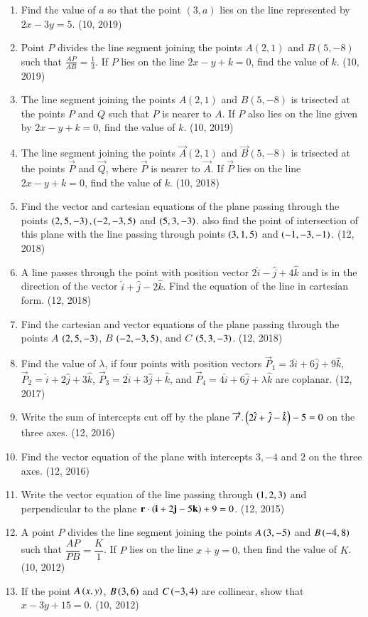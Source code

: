 \begin{enumerate}[label=\thesubsection.\arabic*, ref=\thesubsection.\theenumi]
\item Find the value of $a$ so that the point $(3, a)$ lies on the line represented by $2x - 3y = 5$. \hfill (10, 2019)
\item Point $P$ divides the line segment joining the points $A(2, 1)$ and $B(5, -8)$ such that $\frac{AP}{AB} = \frac{1}{3}$. If $P$ lies on the line $2x - y + k = 0$, find the value of $k$. \hfill (10, 2019)
\item The line segment joining the points $A(2, 1)$ and $B(5, -8)$ is trisected at the points $P$ and $Q$ such that $P$ is nearer to $A$. If $P$ also lies on the line given by $2x - y + k = 0$, find the value of $k$. \hfill (10, 2019)
    \item The line segment joining the points $\vec{A}(2,1)$ and $\vec{B}(5,-8)$ is trisected at the points $\vec{P}$ and $\vec{Q}$, where $\vec{P}$ is nearer to $\vec{A}$. If $\vec{P}$ lies on the line $2x - y + k = 0$, find the value of $k$. \hfill (10, 2018)
\item Find the vector and cartesian equations of the plane passing through the points $\left(2,5,-3\right),\left(-2,-3,5\right)$ and $\left(5,3,-3\right)$. also find the point of intersection of this plane with the line passing through points $\left(3,1,5\right)$ and $\left(-1,-3,-1\right)$.
\hfill (12, 2018)
\item A line passes through the point with position vector $2\hat{i}-\hat{j}+4\hat{k}$ and is in the direction of the vector $\hat{i}+\hat{j}-2\hat{k}$. Find the equation of the line in cartesian form.
\hfill (12, 2018) 
\item Find the cartesian and vector equations of the plane passing through the points $A$ $\left(2, 5, -3\right)$, $B$ $\left(-2, -3, 5\right)$, and $C$ $\left(5, 3, -3\right)$.
\hfill (12, 2018) 
    \item Find the value of $\lambda$, if four points with position vectors $\vec{P}_1 = 3\hat{i} + 6\hat{j} + 9\hat{k}$, $\vec{P}_2 = \hat{i} + 2\hat{j} + 3\hat{k}$, $\vec{P}_3 = 2\hat{i} + 3\hat{j} + \hat{k}$, and $\vec{P}_4 = 4\hat{i} + 6\hat{j} + \lambda\hat{k}$ are coplanar. \hfill (12, 2017)
\item Write the sum of intercepts cut off by the plane $\overrightarrow{r}.\begin{pmatrix}2\hat{i}+\hat{j}-\hat{k}\end{pmatrix} - 5 = 0$ on the three axes. \hfill (12, 2016)
\item Find the vector equation of the plane with intercepts $3,-4$ and $2$ on the three axes. \hfill (12, 2016)
\item Write the vector equation of the line passing through $\left(1,2,3\right)$ and perpendicular to the plane $\mathbf{r}\cdot\left(\mathbf{i}+2\mathbf{j}-5\mathbf{k}\right)+9=0$. \hfill (12, 2015)
\item A point $P$ divides the line segment joining the points $A\left(3,-5\right)$ and $B\left(-4,8\right)$ such that $\dfrac{AP}{PB} = \dfrac{K}{1}$. If $P$ lies on the line $x + y = 0$, then find the value of $K$. 
\hfill (10, 2012)
\item If the point $A\left(x,y\right)$, $B\left(3,6\right)$ and $C\left(-3,4\right)$ are collinear, show that $x - 3y + 15 = 0$. 
\hfill (10, 2012)
\end{enumerate}
